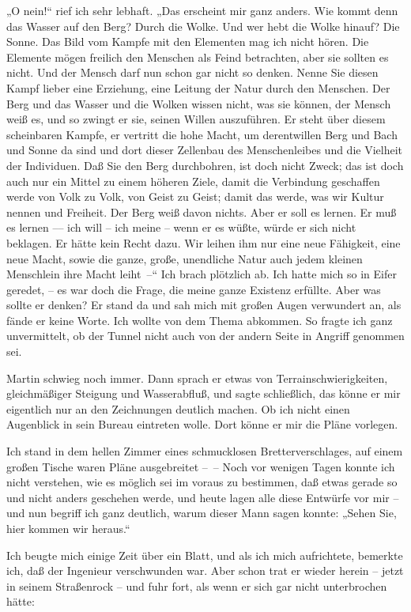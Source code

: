 „O nein!“ rief ich sehr lebhaft. „Das erscheint mir ganz anders.
Wie kommt denn das Wasser auf den Berg? Durch die Wolke. Und wer
hebt die Wolke hinauf? Die Sonne. Das Bild vom Kampfe mit den
Elementen mag ich nicht hören. Die Elemente mögen freilich den
Menschen als Feind betrachten, aber sie sollten es nicht. Und der
Mensch darf nun schon gar nicht so denken. Nenne Sie diesen Kampf
lieber eine Erziehung, eine Leitung der Natur durch den Menschen.
Der Berg und das Wasser und die Wolken wissen nicht, was sie
können, der Mensch weiß es, und so zwingt er sie, seinen Willen
auszuführen. Er steht über diesem scheinbaren Kampfe, er vertritt
die hohe Macht, um derentwillen Berg und Bach und Sonne da sind und
dort dieser Zellenbau des Menschenleibes und die Vielheit der
Individuen. Daß Sie den Berg durchbohren, ist doch nicht Zweck; das
ist doch auch nur ein Mittel zu einem höheren Ziele, damit die
Verbindung geschaffen werde von Volk zu Volk, von Geist zu Geist;
damit das werde, was wir Kultur nennen und Freiheit. Der Berg weiß
davon nichts. Aber er soll es lernen. Er muß es lernen –– ich will
– ich meine – wenn er es wüßte, würde er sich nicht beklagen. Er
hätte kein Recht dazu. Wir leihen ihm nur eine neue Fähigkeit, eine
neue Macht, sowie die ganze, große, unendliche Natur auch jedem
kleinen Menschlein ihre Macht leiht~–“ Ich brach plötzlich ab. Ich
hatte mich so in Eifer geredet, – es war doch die Frage, die meine
ganze Existenz erfüllte. Aber was sollte er denken? Er stand da und
sah mich mit großen Augen verwundert an, als fände er keine Worte.
Ich wollte von dem Thema abkommen. So fragte ich ganz unvermittelt,
ob der Tunnel nicht auch von der andern Seite in Angriff genommen
sei.

Martin schwieg noch immer. Dann sprach er etwas von
Terrainschwierigkeiten, gleichmäßiger Steigung und Wasserabfluß,
und sagte schließlich, das könne er mir eigentlich nur an den
Zeichnungen deutlich machen. Ob ich nicht einen Augenblick in sein
Bureau eintreten wolle. Dort könne er mir die Pläne vorlegen.

Ich stand in dem hellen Zimmer eines schmucklosen
Bretterverschlages, auf einem großen Tische waren Pläne
ausgebreitet –~– Noch vor wenigen Tagen konnte ich nicht verstehen,
wie es möglich sei im voraus zu bestimmen, daß etwas gerade so und
nicht anders geschehen werde, und heute lagen alle diese Entwürfe
vor mir – und nun begriff ich ganz deutlich, warum dieser Mann
sagen konnte: „Sehen Sie, hier kommen wir heraus.“

Ich beugte mich einige Zeit über ein Blatt, und als ich mich
aufrichtete, bemerkte ich, daß der Ingenieur verschwunden war. Aber
schon trat er wieder herein – jetzt in seinem Straßenrock – und
fuhr fort, als wenn er sich gar nicht unterbrochen hätte:

